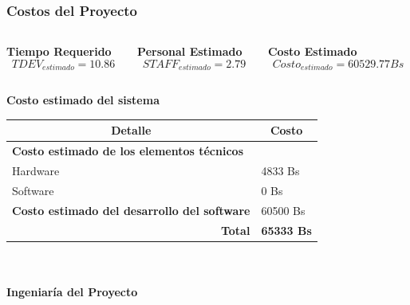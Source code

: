 \documentclass[xcolor=dvipsnames, xcolor=table]{beamer}
\begin{document}
\begin{frame}
    \frametitle{Costos del Proyecto}

    \begin{columns}
      \begin{column}{0.3\textwidth}
        \centering\textbf{\textcolor{color3}{\small Tiempo Requerido}\vspace{2mm}}
        \tiny\[TDEV_{estimado} = 10.86\]
      \end{column}
      \begin{column}{0.3\textwidth}
        \centering\textbf{\textcolor{color3}{\small Personal Estimado}\vspace{2mm}}
        \tiny\[STAFF_{estimado} = 2.79\]
      \end{column}
      \begin{column}{0.3\textwidth}
        \centering\textbf{\textcolor{color3}{\small Costo Estimado}\vspace{2mm}}
        \tiny\[Costo_{estimado} = 60529.77 Bs\]
      \end{column}
    \end{columns}

    \vspace{5mm}
    \centering\textbf{\textcolor{color3}{\small Costo estimado del sistema}\vspace{2mm}}
    \renewcommand{\arraystretch}{1.1}
    \begin{table}[]
    \begin{tabular}{|l|l|}
    \hline
    \multicolumn{1}{|c|}{\textbf{\tiny Detalle}} & \multicolumn{1}{c|}{\textbf{\tiny Costo}} \\ \hline
    \textbf{\tiny Costo estimado de los elementos técnicos} &\\\hline
    \quad \tiny Hardware & \tiny 4833 Bs  \\ \hline
    \quad \tiny Software & \tiny 0 Bs \\ \hline
    \textbf{\tiny Costo estimado del desarrollo del software} & \tiny 60500 Bs \\ \hline
    \multicolumn{1}{|r|}{\textbf{\tiny Total}} & \cellcolor[HTML]{FFCCC9}\textbf{\tiny 65333 Bs} \\ \hline
    \end{tabular}
    \end{table}

\end{frame}

\begin{frame}
    \centering\color{color3}{\rule{10cm}{5pt}}\\
    \vspace{-3mm}
    \centering\color{color3}{\rule{10cm}{1.5pt}}\\
    \vspace{2mm}
    \centering\textbf{\huge{\textcolor{color1}{Ingeniaría del Proyecto}}}\\
    \centering\color{color3}{\rule{10cm}{1.5pt}}\\
\end{frame}
\end{document}
